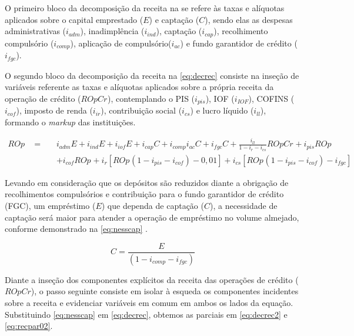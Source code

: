 \documentclass[
  12pt,
  12pt,
  openright,
  oneside,
  a4paper,
  chapter=TITLE,
  section=TITLE,
  subsection=TITLE,
  subsubsection=TITLE,
  english,
  portugues,
  sumario=tradicional]{abntex2}
\begin{document}
\begin{apendicesenv}
O primeiro bloco da decomposição da receita na se refere às taxas e alíquotas aplicados sobre o capital emprestado ($E$) e captação ($C$), sendo elas as despesas administrativas ($i_{adm}$), inadimplência ($i_{ind}$), captação ($i_{cap}$), recolhimento compulsório ($i_{comp}$), aplicação de compulsório($i_{ac}$) e fundo garantidor de crédito ($i_{fgc}$).

O segundo bloco da decomposição da receita na \autoref{eq:decrec} consiste na inseção de variáveis referente as taxas e alíquotas aplicados sobre a própria receita da operação de crédito ($ROpCr_{}$), contemplando o PIS ($i_{pis}$), IOF ($i_{IOF}$), COFINS ($i_{cof}$), imposto de renda ($i_{ir}$), contribuição social ($i_{cs}$) e lucro líquido ($i_{ll}$), formando o \emph{markup} das instituições.



\begin{equation}\label{eq:decrec}
\begin{aligned}
ROp_{} \hspace{10pt} = \hspace{10pt} &  i_{adm}E + i_{ind}E + i_{iof}E + i_{cap}C + i_{comp}i_{ac}C + i_{fgc}C + \frac{i_{ll}}{1 - i_{r} - i_{cs}}ROpCr_{} + i_{pis}ROp_{} \\ 
& + i_{cof}ROp_{} +  i_{r} [ROp_{}(1-i_{pis} - i_{cof}) - 0,01] + i_{cs} [ROp_{}(1-i_{pis} - i_{cof}) - i_{fgc}]
\end{aligned}
\end{equation}

  
Levando em consideração que os depósitos são reduzidos diante a obrigação de recolhimentos compulsórios e contribuição para o fundo garantidor de crédito (FGC), um empréstimo ($E$) que dependa de captação ($C$), a necessidade de captação será maior para atender a operação de empréstimo no volume almejado, conforme demonstrado na \autoref{eq:nesscap} \cite{cardoso:1999}.



\begin{equation}\label{eq:nesscap}
C = \frac{E}{(1 - i_{comp} - i_{fgc})}
\end{equation}


Diante a inseção dos componentes explícitos da receita das operações de crédito ($ROpCr$), o passo seguinte consiste em isolar à esqueda os componentes incidentes sobre a receita e evidenciar variáveis em comum em ambos os lados da equação. Substituindo \autoref{eq:nesscap} em \autoref{eq:decrec}, obtemos as parciais em \autoref{eq:decrec2} e \autoref{eq:recpar02}. 



\end{apendicesenv}
\end{document}

